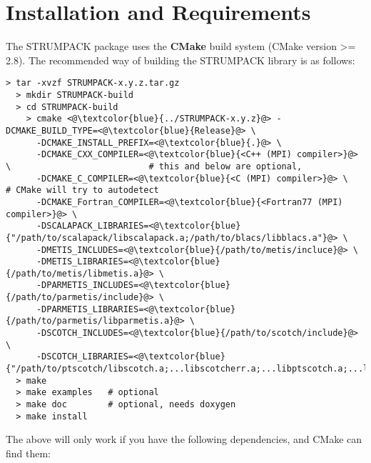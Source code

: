 \documentclass{article}
\begin{document}
\section{Installation and Requirements}\label{sec::installation}
The STRUMPACK package uses the \textbf{CMake} build system (CMake version >= 2.8). The recommended way of building the
STRUMPACK library is as follows:
\begin{lstlisting}[style=bash]
  > tar -xvzf STRUMPACK-x.y.z.tar.gz
  > mkdir STRUMPACK-build
  > cd STRUMPACK-build
    > cmake <@\textcolor{blue}{../STRUMPACK-x.y.z}@> -DCMAKE_BUILD_TYPE=<@\textcolor{blue}{Release}@> \
      -DCMAKE_INSTALL_PREFIX=<@\textcolor{blue}{.}@> \
      -DCMAKE_CXX_COMPILER=<@\textcolor{blue}{<C++ (MPI) compiler>}@> \                           # this and below are optional,
      -DCMAKE_C_COMPILER=<@\textcolor{blue}{<C (MPI) compiler>}@> \                               # CMake will try to autodetect
      -DCMAKE_Fortran_COMPILER=<@\textcolor{blue}{<Fortran77 (MPI) compiler>}@> \
      -DSCALAPACK_LIBRARIES=<@\textcolor{blue}{"/path/to/scalapack/libscalapack.a;/path/to/blacs/libblacs.a"}@> \
      -DMETIS_INCLUDES=<@\textcolor{blue}{/path/to/metis/incluce}@> \
      -DMETIS_LIBRARIES=<@\textcolor{blue}{/path/to/metis/libmetis.a}@> \
      -DPARMETIS_INCLUDES=<@\textcolor{blue}{/path/to/parmetis/include}@> \
      -DPARMETIS_LIBRARIES=<@\textcolor{blue}{/path/to/parmetis/libparmetis.a}@> \
      -DSCOTCH_INCLUDES=<@\textcolor{blue}{/path/to/scotch/include}@> \
      -DSCOTCH_LIBRARIES=<@\textcolor{blue}{"/path/to/ptscotch/libscotch.a;...libscotcherr.a;...libptscotch.a;...libptscotcherr.a"}@>
  > make
  > make examples   # optional
  > make doc        # optional, needs doxygen
  > make install
\end{lstlisting}
The above will only work if you have the following dependencies, and
CMake can find them:
\end{document}
